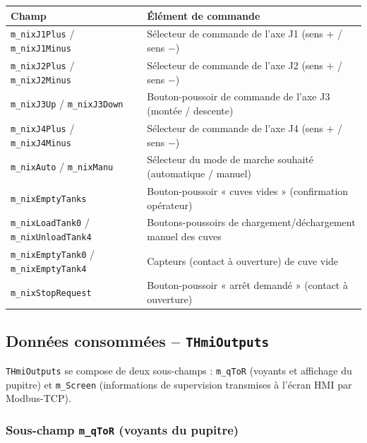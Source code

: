 \begin{center}
\begin{tabular}{|l|p{8.5cm}|}
\hline
\textbf{Champ} & \textbf{Élément de commande} \\
\hline
\texttt{m\_nixJ1Plus} / \texttt{m\_nixJ1Minus} & Sélecteur de commande de
l'axe J1 (sens $+$ / sens $-$) \\
\hline
\texttt{m\_nixJ2Plus} / \texttt{m\_nixJ2Minus} & Sélecteur de commande de
l'axe J2 (sens $+$ / sens $-$) \\
\hline
\texttt{m\_nixJ3Up} / \texttt{m\_nixJ3Down} & Bouton-poussoir de commande
de l'axe J3 (montée / descente) \\
\hline
\texttt{m\_nixJ4Plus} / \texttt{m\_nixJ4Minus} & Sélecteur de commande de
l'axe J4 (sens $+$ / sens $-$) \\
\hline
\texttt{m\_nixAuto} / \texttt{m\_nixManu} & Sélecteur du mode de marche
souhaité (automatique / manuel) \\
\hline
\texttt{m\_nixEmptyTanks} & Bouton-poussoir « cuves vides » (confirmation
opérateur) \\
\hline
\texttt{m\_nixLoadTank0} / \texttt{m\_nixUnloadTank4} & Boutons-poussoirs
de chargement/déchargement manuel des cuves \\
\hline
\texttt{m\_nixEmptyTank0} / \texttt{m\_nixEmptyTank4} & Capteurs (contact
à ouverture) de cuve vide \\
\hline
\texttt{m\_nixStopRequest} & Bouton-poussoir « arrêt demandé » (contact à
ouverture) \\
\hline
\end{tabular}
\end{center}

\subsection{Données consommées -- \texttt{THmiOutputs}}

\texttt{THmiOutputs} se compose de deux sous-champs : \texttt{m\_qToR}
(voyants et affichage du pupitre) et \texttt{m\_Screen} (informations de
supervision transmises à l'écran HMI par Modbus-TCP).

\subsubsection{Sous-champ \texttt{m\_qToR} (voyants du pupitre)}

